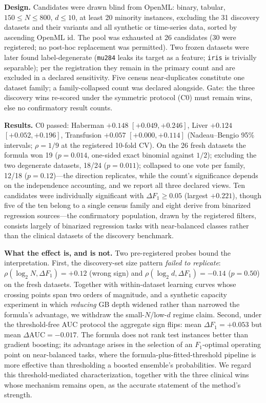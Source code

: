 \documentclass[journal]{IEEEtran}
\begin{document}
\textbf{Design.}  Candidates were drawn blind from OpenML: binary,
tabular, $150 \leq N \leq 800$, $d \leq 10$, at least 20
minority instances, excluding the 31 discovery datasets and their
variants and all synthetic or time-series data, sorted by ascending
OpenML id.  The pool was exhausted at 26 candidates (30 were
registered; no post-hoc replacement was permitted).  Two frozen
datasets were later found label-degenerate (\texttt{mu284} leaks
its target as a feature; \texttt{iris} is trivially separable);
per the registration they remain in the primary count and are
excluded in a declared sensitivity.  Five census near-duplicates
constitute one dataset family; a family-collapsed count was
declared alongside.  Gate: the three discovery wins re-scored
under the symmetric protocol (C0) must remain wins, else no
confirmatory result counts.

\textbf{Results.}  C0 passed: Haberman ${+}0.148$
$[{+}0.049, {+}0.246]$, Liver ${+}0.124$ $[{+}0.052, {+}0.196]$,
Transfusion ${+}0.057$ $[{+}0.000, {+}0.114]$ (Nadeau--Bengio 95\%
intervals; $\rho = 1/9$ at the registered 10-fold CV).  On the 26
fresh datasets the formula won 19 ($p = 0.014$, one-sided exact
binomial against $1/2$); excluding the two degenerate datasets,
18/24 ($p = 0.011$); collapsed to one vote per family, 12/18
($p = 0.12$)---the direction replicates, while the count's
significance depends on the independence accounting, and we report
all three declared views.  Ten candidates were individually
significant with $\Delta F_1 \geq 0.05$ (largest ${+}0.221$),
though five of the ten belong to a single census family and eight
derive from binarized regression sources---the confirmatory
population, drawn by the registered filters, consists largely of
binarized regression tasks with near-balanced classes rather than
the clinical datasets of the discovery benchmark.

\textbf{What the effect is, and is not.}  Two pre-registered
probes bound the interpretation.  First, the discovery-set size
pattern \emph{failed to replicate}:
$\rho(\log_2 N, \Delta F_1) = {+}0.12$ (wrong sign) and
$\rho(\log_2 d, \Delta F_1) = {-}0.14$ ($p = 0.50$) on the
fresh datasets.  Together with within-dataset learning curves
whose crossing points span two orders of magnitude, and a
synthetic capacity experiment in which \emph{reducing} GB depth
widened rather than narrowed the formula's advantage, we withdraw
the small-$N$/low-$d$ regime claim.  Second, under the
threshold-free AUC protocol the aggregate sign flips: mean
$\Delta F_1 = {+}0.053$ but mean $\Delta\mathrm{AUC} =
{-}0.017$.  The formula does not rank test instances better than
gradient boosting; its advantage arises in the selection of an
$F_1$-optimal operating point on near-balanced tasks, where the
formula-plus-fitted-threshold pipeline is more effective than
thresholding a boosted ensemble's probabilities.  We regard this
threshold-mediated characterization, together with the three
clinical wins whose mechanism remains open, as the accurate
statement of the method's strength.
\end{document}
